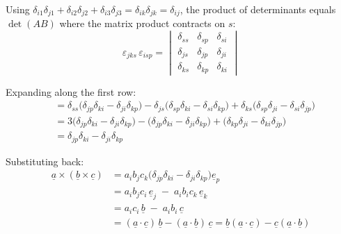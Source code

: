 \documentclass{article}
\newcommand{\vv}[1]{\underline{#1}}
\begin{document}
\noindent
Using
$\delta_{i1}\delta_{j1}+\delta_{i2}\delta_{j2}+\delta_{i3}\delta_{j3}
 = \delta_{ik}\delta_{jk} = \delta_{ij}$,
the product of determinants equals $\det(AB)$ where the matrix product
contracts on $s$:
\[
  \varepsilon_{jks}\,\varepsilon_{isp}
  =
  \begin{vmatrix}
    \delta_{ss} & \delta_{sp} & \delta_{si} \\
    \delta_{js} & \delta_{jp} & \delta_{ji} \\
    \delta_{ks} & \delta_{kp} & \delta_{ki}
  \end{vmatrix}
\]

%
%
\noindent
Expanding along the first row:
\begin{align*}
  &= \delta_{ss}\bigl(\delta_{jp}\delta_{ki} - \delta_{ji}\delta_{kp}\bigr)
   - \delta_{js}\bigl(\delta_{sp}\delta_{ki} - \delta_{si}\delta_{kp}\bigr)
   + \delta_{ks}\bigl(\delta_{sp}\delta_{ji} - \delta_{si}\delta_{jp}\bigr) \\[4pt]
  &= 3\bigl(\delta_{jp}\delta_{ki} - \delta_{ji}\delta_{kp}\bigr)
   - \bigl(\delta_{jp}\delta_{ki} - \delta_{ji}\delta_{kp}\bigr)
   + \bigl(\delta_{kp}\delta_{ji} - \delta_{ki}\delta_{jp}\bigr) \\[4pt]
  &= \delta_{jp}\delta_{ki} - \delta_{ji}\delta_{kp}
\end{align*}

%
%
\noindent
Substituting back:
\begin{align*}
  \vv{a}\times(\vv{b}\times\vv{c})
  &= a_i b_j c_k
     \bigl(\delta_{jp}\delta_{ki} - \delta_{ji}\delta_{kp}\bigr)\vv{e}_p \\
  &= a_i b_j c_i\,\vv{e}_j \;-\; a_i b_i c_k\,\vv{e}_k \\
  &= a_i c_i\,\vv{b} \;-\; a_i b_i\,\vv{c} \\
  &= (\vv{a}\cdot\vv{c})\,\vv{b} - (\vv{a}\cdot\vv{b})\,\vv{c}
   = \vv{b}(\vv{a}\cdot\vv{c}) - \vv{c}(\vv{a}\cdot\vv{b})
\end{align*}
\end{document}
